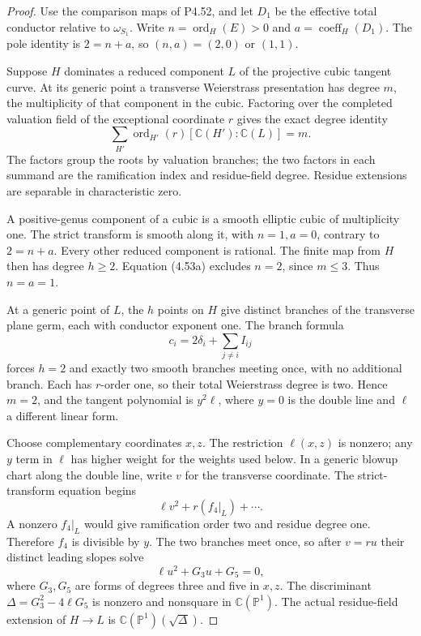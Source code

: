 \begin{proof}
Use the comparison maps of P4.52, and let $D_1$ be the
effective total conductor relative to $\omega_{S_1}$.
Write $n=\operatorname{ord}_H(E)>0$ and
$a=\operatorname{coeff}_H(D_1)$. The pole identity is
$2=n+a$, so $(n,a)=(2,0)$ or $(1,1)$.

Suppose $H$ dominates a reduced component $L$ of the
projective cubic tangent curve. At its generic point
a transverse Weierstrass presentation has degree
$m$, the multiplicity of that component in the cubic.
Factoring over the completed valuation field of the
exceptional coordinate $r$ gives the exact degree
identity
\[
 \sum_{H'}\operatorname{ord}_{H'}(r)
                 [\mathbb C(H'):\mathbb C(L)]=m.             \tag{4.53a}
\]
The factors group the roots by valuation branches;
the two factors in each summand are the ramification
index and residue-field degree. Residue extensions
are separable in characteristic zero.

A positive-genus component of a cubic is a smooth
elliptic cubic of multiplicity one. The strict
transform is smooth along it, with $n=1,a=0$,
contrary to $2=n+a$. Every other reduced component
is rational. The finite map from $H$ then has degree
$h\ge2$. Equation (4.53a) excludes $n=2$, since
$m\le3$. Thus $n=a=1$.

At a generic point of $L$, the $h$ points on $H$
give distinct branches of the transverse plane germ,
each with conductor exponent one. The branch formula
\[
             c_i=2\delta_i+\sum_{j\ne i}I_{ij}
\]
forces $h=2$ and exactly two smooth branches meeting
once, with no additional branch. Each has $r$-order
one, so their total Weierstrass degree is two. Hence
$m=2$, and the tangent polynomial is $y^2\ell$,
where $y=0$ is the double line and $\ell$ a different
linear form.

Choose complementary coordinates $x,z$. The
restriction $\ell(x,z)$ is nonzero; any $y$ term in
$\ell$ has higher weight for the weights used below.
In a generic blowup chart along the double line,
write $v$ for the transverse coordinate. The
strict-transform equation begins
\[
                 \ell v^2+r(f_4|_L)+\cdots.
\]
A nonzero $f_4|_L$ would give ramification order two
and residue degree one. Therefore $f_4$ is divisible
by $y$. The two branches meet once, so after
$v=ru$ their distinct leading slopes solve
\[
                         \ell u^2+G_3u+G_5=0,
\]
where $G_3,G_5$ are forms of degrees three and five
in $x,z$. The discriminant
$\Delta=G_3^2-4\ell G_5$ is nonzero and nonsquare
in $\mathbb C(\mathbb P^1)$. The actual residue-field
extension of $H\to L$ is
$\mathbb C(\mathbb P^1)(\sqrt\Delta)$.


\end{proof}
